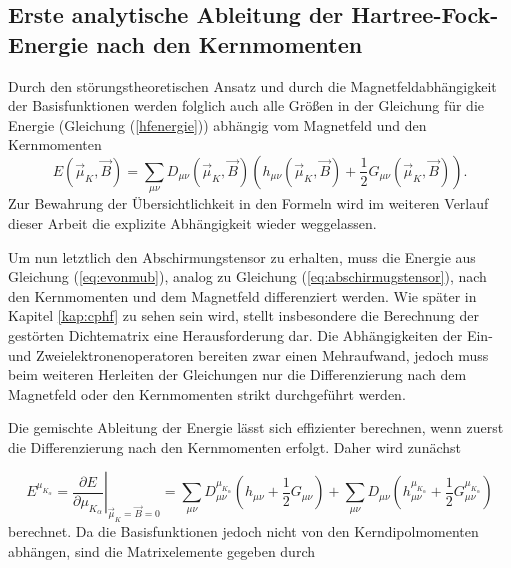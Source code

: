 \subsection{Erste analytische Ableitung der Hartree-Fock-Energie nach den Kernmomenten}

  	Durch den störungstheoretischen Ansatz und durch die Magnetfeldabhängigkeit der Basisfunktionen werden folglich auch alle Größen in der Gleichung für die Energie (Gleichung (\ref{hfenergie})) abhängig vom Magnetfeld und den Kernmomenten
  	\begin{equation}\label{eq:evonmub}
  	  E(\vec{\mu}_K,\vec{B})=\sum_{\mu\nu}D_{\mu\nu}(\vec{\mu}_K,\vec{B})(h_{\mu\nu}(\vec{\mu}_K,\vec{B})+\frac{1}{2}G_{\mu\nu}(\vec{\mu}_K,\vec{B})).
	\end{equation}  	 
  	Zur Bewahrung der Übersichtlichkeit in den Formeln wird im weiteren Verlauf dieser Arbeit die explizite Abhängigkeit wieder weggelassen.
  	
  	Um nun letztlich den Abschirmungstensor zu erhalten, muss die Energie aus Gleichung (\ref{eq:evonmub}), analog zu Gleichung (\ref{eq:abschirmugstensor}), nach den Kernmomenten und dem Magnetfeld differenziert werden. Wie später in Kapitel \ref{kap:cphf} zu sehen sein wird, stellt insbesondere die Berechnung der gestörten Dichtematrix eine Herausforderung dar. Die Abhängigkeiten der Ein- und Zweielektronenoperatoren bereiten zwar einen Mehraufwand, jedoch muss beim weiteren Herleiten der Gleichungen nur die Differenzierung nach dem Magnetfeld oder den Kernmomenten strikt durchgeführt werden.
  	 
  	Die gemischte Ableitung der Energie lässt sich effizienter berechnen, wenn zuerst die Differenzierung nach den Kernmomenten erfolgt\supercite{baron1991}. Daher wird zunächst
  	
  	\begin{equation}\label{eq:enachmu}
  	  E^{\mu_{K_\alpha}}=\left.\frac{\partial E}{\partial\mu_{K_\alpha}}\right|_{\vec{\mu}_K=\vec{B}=0}=\sum_{\mu\nu}D_{\mu\nu}^{\mu_{K_\alpha}}\left(h_{\mu\nu}+\frac{1}{2}G_{\mu\nu}\right)+\sum_{\mu\nu}D_{\mu\nu}\left(h_{\mu\nu}^{\mu_{K_\alpha}}+\frac{1}{2}G_{\mu\nu}^{\mu_{K_\alpha}}\right)
  	\end{equation}
     berechnet. Da die Basisfunktionen jedoch nicht von den Kerndipolmomenten abhängen, sind die Matrixelemente gegeben durch
     
